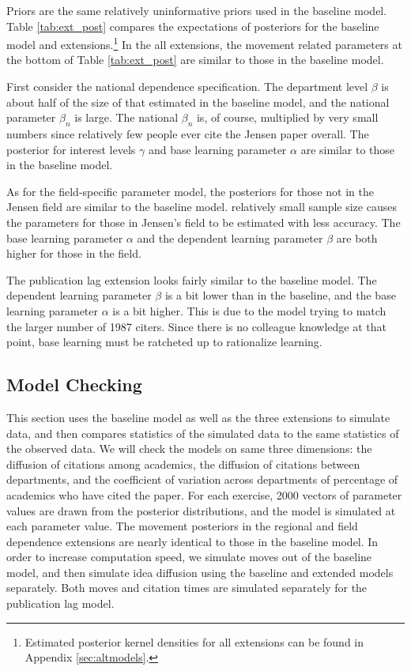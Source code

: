 Priors are the same relatively uninformative priors used in the baseline model.  Table \ref{tab:ext_post} compares the expectations of posteriors for the baseline model and extensions.\footnote{Estimated posterior kernel densities 
    for all extensions can be found in Appendix \ref{sec:altmodels}.}
In the all extensions, the movement related parameters at the bottom of Table \ref{tab:ext_post} are
similar to those in the baseline model.

First consider the national dependence specification.
The department level $\beta$ is about half of the size of that
estimated in the baseline model, and the national parameter $\beta_n$ is large.
The national $\beta_n$ is, of course, multiplied by very small numbers since relatively few people ever
cite the Jensen paper overall.  The posterior for interest levels $\gamma$ and base learning parameter
$\alpha$ are similar to those in the baseline model.

As for the field-specific parameter model, the posteriors for those
not in the Jensen field are similar to the baseline model. 
relatively small sample size causes the
parameters for those in Jensen's field to be estimated with less
accuracy. The base learning parameter
$\alpha$ and the dependent learning parameter $\beta$  are both higher for those in the field.

The publication lag extension looks fairly similar to the baseline model.  The dependent learning parameter $\beta$ is a bit lower than in the baseline, and the base learning parameter  $\alpha$ is a bit higher.  This is due to the model trying to match the larger number of 1987 citers.  Since there is no colleague knowledge at that point, base learning must be ratcheted up to rationalize learning.

\subsection{Model Checking}
\label{sec:modcheck}

This section uses the baseline model as well as the three extensions to
simulate data, and then compares statistics of the simulated data to
the same statistics of the observed data. We will check the models on same
three dimensions: the diffusion of citations among academics, the
diffusion of citations between departments, and the coefficient of
variation across departments of percentage of academics who have cited the
paper. For each exercise, 2000 vectors of parameter values are drawn
from the posterior distributions, and the model is simulated at each parameter value.
The movement posteriors in the regional and field dependence extensions are
nearly identical to those in the baseline model.
In order to increase computation speed, we simulate moves out of the
baseline model, and then simulate idea diffusion using the baseline and extended
models separately.  Both moves and citation times are simulated separately for
the publication lag model.

